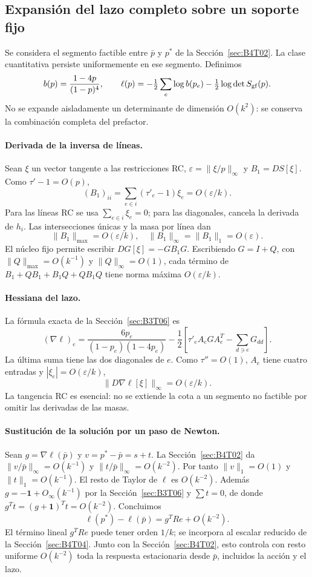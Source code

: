 \subsection{Expansión del lazo completo sobre un soporte fijo}\label{sec:B4T03}
Se considera el segmento factible entre $\bar p$ y $p^*$ de la Sección~\ref{sec:B4T02}.
La clase cuantitativa persiste uniformemente en ese segmento.
Definimos
\[
 b(p)=\frac{1-4p}{(1-p)^4},\qquad
 \ell(p)=-\tfrac12\sum_e\log b(p_e)-\tfrac12\log\det S_{\rm gf}(p).
\]
No se expande aisladamente un determinante de dimensión $O(k^2)$:
se conserva la combinación completa del prefactor.

\paragraph{Derivada de la inversa de líneas.}
Sean $\xi$ un vector tangente a las restricciones RC, $\varepsilon=\|\xi/p\|_\infty$
y $B_1=DS[\xi]$. Como $\tau'-1=O(p)$,
\[
 (B_1)_{ii}=\sum_{e\in i}(\tau'_e-1)\xi_e=O(\varepsilon/k).
\]
Para las líneas RC se usa $\sum_{e\in i}\xi_e=0$; para las diagonales, cancela la
derivada de $h_i$. Las intersecciones únicas y la masa por línea dan
\[
 \|B_1\|_{\max}=O(\varepsilon/k),\quad
 \|B_1\|_\infty=\|B_1\|_1=O(\varepsilon).
\]
El núcleo fijo permite escribir $DG[\xi]=-GB_1G$.
Escribiendo $G=I+Q$, con $\|Q\|_{\max}=O(k^{-1})$ y
$\|Q\|_\infty=O(1)$, cada término de
$B_1+QB_1+B_1Q+QB_1Q$ tiene norma máxima $O(\varepsilon/k)$.

\paragraph{Hessiana del lazo.}
La fórmula exacta de la Sección~\ref{sec:B3T06} es
\[
 (\nabla\ell)_e=\frac{6p_e}{(1-p_e)(1-4p_e)}
 -\frac12\left[\tau'_e A_eGA_e^T-\sum_{d\ni e}G_{dd}\right].
\]
La última suma tiene las dos diagonales de $e$.
Como $\tau''=O(1)$, $A_e$ tiene cuatro entradas y $|\xi_e|=O(\varepsilon/k)$,
\[
 \boxed{\|D\nabla\ell[\xi]\|_\infty=O(\varepsilon/k).}
\]
La tangencia RC es esencial: no se extiende la cota a un segmento
no factible por omitir las derivadas de las masas.

\paragraph{Sustitución de la solución por un paso de Newton.}
Sean $g=\nabla\ell(\bar p)$ y $v=p^*-\bar p=s+t$.
La Sección~\ref{sec:B4T02} da $\|v/\bar p\|_\infty=O(k^{-1})$ y
$\|t/\bar p\|_\infty=O(k^{-2})$.
Por tanto $\|v\|_1=O(1)$ y $\|t\|_1=O(k^{-1})$.
El resto de Taylor de $\ell$ es $O(k^{-2})$.
Además $g=-\mathbf1+O_\infty(k^{-1})$ por la Sección~\ref{sec:B3T06} y $\sum t=0$, de donde
$g^Tt=(g+\mathbf1)^Tt=O(k^{-2})$.
Concluimos
\[
 \boxed{\ell(p^*)-\ell(\bar p)=g^TRe+O(k^{-2}).}
\]
El término lineal $g^TRe$ puede tener orden $1/k$; se incorpora al escalar reducido de la
Sección~\ref{sec:B4T04}. Junto con la Sección~\ref{sec:B4T02}, esto controla con resto uniforme
$O(k^{-2})$ toda la respuesta estacionaria desde $\bar p$, incluidos la acción y el lazo.
